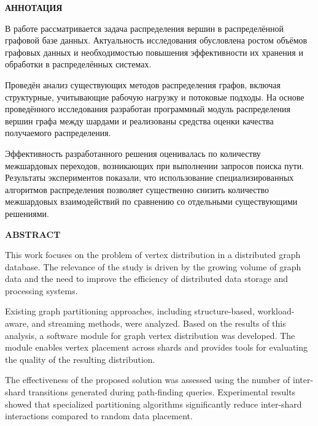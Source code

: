 \setcounter{page}{4}
\begin{center}
    \textbf{АННОТАЦИЯ}
    \vspace{-16pt}
\end{center}

В работе рассматривается задача распределения вершин в распределённой графовой базе данных. Актуальность исследования обусловлена ростом объёмов графовых данных и необходимостью повышения эффективности их хранения и обработки в распределённых системах.

Проведён анализ существующих методов распределения графов, включая структурные, учитывающие рабочую нагрузку и потоковые подходы. На основе проведённого исследования разработан программный модуль распределения вершин графа между шардами и реализованы средства оценки качества получаемого распределения.

Эффективность разработанного решения оценивалась по количеству межшардовых переходов, возникающих при выполнении запросов поиска пути. Результаты экспериментов показали, что использование специализированных алгоритмов распределения позволяет существенно снизить количество межшардовых взаимодействий по сравнению со отдельными существующими решениями.
\begin{center}
    \textbf{ABSTRACT}
    \vspace{-13pt}
\end{center}

This work focuses on the problem of vertex distribution in a distributed graph database. The relevance of the study is driven by the growing volume of graph data and the need to improve the efficiency of distributed data storage and processing systems.

Existing graph partitioning approaches, including structure-based, workload-aware, and streaming methods, were analyzed. Based on the results of this analysis, a software module for graph vertex distribution was developed. The module enables vertex placement across shards and provides tools for evaluating the quality of the resulting distribution.

The effectiveness of the proposed solution was assessed using the number of inter-shard transitions generated during path-finding queries. Experimental results showed that specialized partitioning algorithms significantly reduce inter-shard interactions compared to random data placement.